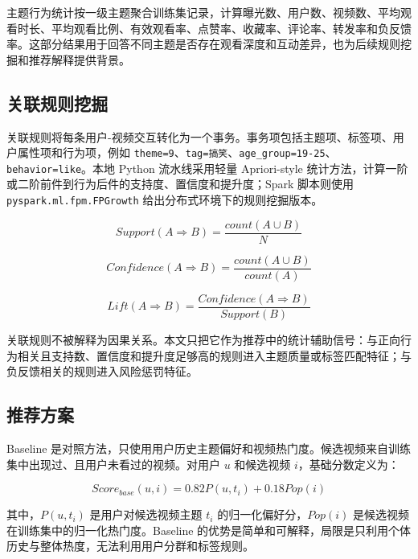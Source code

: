 \documentclass[UTF8,a4paper,12pt,fontset=none]{ctexart}
\begin{document}
主题行为统计按一级主题聚合训练集记录，计算曝光数、用户数、视频数、平均观看时长、平均观看比例、有效观看率、点赞率、收藏率、评论率、转发率和负反馈率。这部分结果用于回答不同主题是否存在观看深度和互动差异，也为后续规则挖掘和推荐解释提供背景。

\subsection{关联规则挖掘}

关联规则将每条用户-视频交互转化为一个事务。事务项包括主题项、标签项、用户属性项和行为项，例如 \texttt{theme=9}、\texttt{tag=搞笑}、\texttt{age\_group=19-25}、\texttt{behavior=like}。本地 Python 流水线采用轻量 Apriori-style 统计方法，计算一阶或二阶前件到行为后件的支持度、置信度和提升度；Spark 脚本则使用 \texttt{pyspark.ml.fpm.FPGrowth} 给出分布式环境下的规则挖掘版本。

\begin{equation}
Support(A\Rightarrow B)=\frac{count(A\cup B)}{N}
\end{equation}

\begin{equation}
Confidence(A\Rightarrow B)=\frac{count(A\cup B)}{count(A)}
\end{equation}

\begin{equation}
Lift(A\Rightarrow B)=\frac{Confidence(A\Rightarrow B)}{Support(B)}
\end{equation}

关联规则不被解释为因果关系。本文只把它作为推荐中的统计辅助信号：与正向行为相关且支持数、置信度和提升度足够高的规则进入主题质量或标签匹配特征；与负反馈相关的规则进入风险惩罚特征。

\subsection{推荐方案}

Baseline 是对照方法，只使用用户历史主题偏好和视频热门度。候选视频来自训练集中出现过、且用户未看过的视频。对用户 \(u\) 和候选视频 \(i\)，基础分数定义为：

\begin{equation}
Score_{base}(u,i)=0.82P(u,t_i)+0.18Pop(i)
\end{equation}

其中，\(P(u,t_i)\) 是用户对候选视频主题 \(t_i\) 的归一化偏好分，\(Pop(i)\) 是候选视频在训练集中的归一化热门度。Baseline 的优势是简单和可解释，局限是只利用个体历史与整体热度，无法利用用户分群和标签规则。
\end{document}

